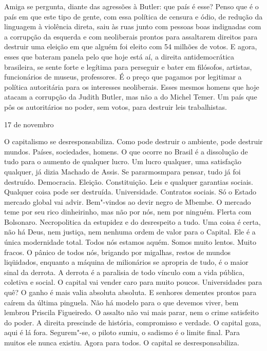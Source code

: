 Amiga se pergunta, diante das agressões à Butler: que país é esse? Penso
que é o país em que este tipo de gente, com essa política de censura e
ódio, de redução da linguagem à violência direta, saiu às ruas junto com
pessoas boas indignadas com a corrupção da esquerda e com neoliberais
prontos para assaltarem direitos para destruir uma eleição em que alguém
foi eleito com 54 milhões de votos. E agora, esses que bateram panela
pelo que hoje está aí, a direita antidemocrática brasileira, se sente
forte e legítima para perseguir e bater em filósofos, artistas,
funcionários de museus, professores. É o preço que pagamos por legitimar
a política autoritária para os interesses neoliberais. Esses mesmos
homens que hoje atacam a corrupção da Judith Butler, mas não a do Michel
Temer. Um país que pôs os autoritários no poder, sem votos, para
destruir leis trabalhistas.

\begin{flushright}
17 de novembro
\end{flushright}

O capitalismo se desresponsabiliza. Como pode destruir o ambiente, pode
destruir mundos. Países, sociedades, homens. O que ocorre no Brasil é a
dissolução de tudo para o aumento de qualquer lucro. Um lucro qualquer,
uma satisfação qualquer, já dizia Machado de Assis. Se pararmosmpara
pensar, tudo já foi destruído. Democracia. Eleição. Constituição. Leis e
qualquer garantias sociais. Qualquer coisa pode ser destruída.
Universidade. Contratos sociais. Só o Estado mercado global vai advir.
Bem"-vindos ao devir negro de Mbembe. O mercado teme por seu rico
dinheirinho, mas não por nós, nem por ninguém. Flerta com Bolsonaro.
Necropolitica da estupidez e do desrespeito a tudo. Uma coisa é certa,
não há Deus, nem justiça, nem nenhuma ordem de valor para o Capital. Ele
é a única modernidade total. Todos nós estamos aquém. Somos muito
lentos. Muito fracos. O pânico de todos nós, brigando por migalhas,
restos de mundos liqüidados, enquanto a máquina de milionários se
apropria de tudo, é o maior sinal da derrota. A derrota é a paralisia de
todo vínculo com a vida pública, coletiva e social. O capital vai vender
caro para muito poucos. Universidades para quê? O ganho é mais valia
absoluta absoluta. E senhores dementes prontos para caírem da última
pinguela. Não há modelo para o que devemos viver, bem lembrou Priscila
Figueiredo. O assalto não vai mais parar, nem o crime satisfeito do
poder. A direita prescinde de história, compromisso e verdade. O capital
goza, aqui é lá fora. Segurem"-se, o piloto sumiu, o sadismo é o limite
final. Para muitos ele nunca existiu. Agora para todos. O capital se
desresponsabiliza.

